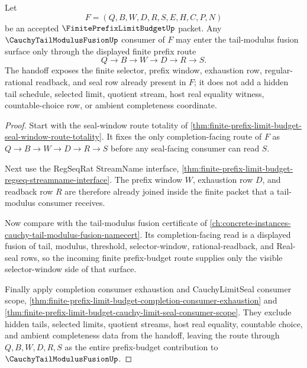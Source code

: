 \begin{theorem}
\label{thm:finite-prefix-limit-budget-tail-modulus-fusion}
Let
$$
F=(Q,B,W,D,R,S,E,H,C,P,N)
$$
be an accepted $\FinitePrefixLimitBudgetUp$ packet. Any $\CauchyTailModulusFusionUp$ consumer of $F$ may enter the tail-modulus fusion surface only through the displayed finite prefix route
$$
Q \to B \to W \to D \to R \to S.
$$
The handoff exposes the finite selector, prefix window, exhaustion row, regular-rational readback, and seal row already present in $F$; it does not add a hidden tail schedule, selected limit, quotient stream, host real equality witness, countable-choice row, or ambient completeness coordinate.
\end{theorem}
\begin{proof}
Start with the seal-window route totality of \autoref{thm:finite-prefix-limit-budget-seal-window-route-totality}. It fixes the only completion-facing route of $F$ as $Q \to B \to W \to D \to R \to S$ before any seal-facing consumer can read $S$.

Next use the RegSeqRat StreamName interface, \autoref{thm:finite-prefix-limit-budget-regseq-streamname-interface}. The prefix window $W$, exhaustion row $D$, and readback row $R$ are therefore already joined inside the finite packet that a tail-modulus consumer receives.

Now compare with the tail-modulus fusion certificate of \autoref{ch:concrete-instances-cauchy-tail-modulus-fusion-namecert}. Its completion-facing read is a displayed fusion of tail, modulus, threshold, selector-window, rational-readback, and Real-seal rows, so the incoming finite prefix-budget route supplies only the visible selector-window side of that surface.

Finally apply completion consumer exhaustion and CauchyLimitSeal consumer scope, \autoref{thm:finite-prefix-limit-budget-completion-consumer-exhaustion} and \autoref{thm:finite-prefix-limit-budget-cauchy-limit-seal-consumer-scope}. They exclude hidden tails, selected limits, quotient streams, host real equality, countable choice, and ambient completeness data from the handoff, leaving the route through $Q,B,W,D,R,S$ as the entire prefix-budget contribution to $\CauchyTailModulusFusionUp$.
\end{proof}

